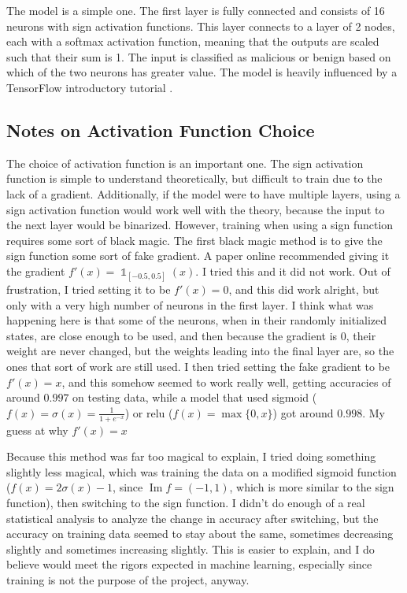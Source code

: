 \documentclass{article}
\DeclareMathOperator{\im}{Im}
\DeclareMathOperator{\1}{\mathbb{1}}
\begin{document}
The model is a simple one. The first layer is fully connected and consists of 16 neurons with sign activation functions. This layer connects to a layer of 2 nodes, each with a softmax activation function, meaning that the outputs are scaled such that their sum is 1. The input is classified as malicious or benign based on which of the two neurons has greater value. The model is heavily influenced by a TensorFlow introductory tutorial \cite{tftut}.

\subsection{Notes on Activation Function Choice}

The choice of activation function is an important one. The sign activation function is simple to understand theoretically, but difficult to train due to the lack of a gradient. Additionally, if the model were to have multiple layers, using a sign activation function would work well with the theory, because the input to the next layer would be binarized. However, training when using a sign function requires some sort of black magic. The first black magic method is to give the sign function some sort of fake gradient. A paper online recommended giving it the gradient $f'(x) = \1_{[-0.5, 0.5]}(x)$. I tried this and it did not work. Out of frustration, I tried setting it to be $f'(x) = 0$, and this did work alright, but only with a very high number of neurons in the first layer. I think what was happening here is that some of the neurons, when in their randomly initialized states, are close enough to be used, and then because the gradient is 0, their weight are never changed, but the weights leading into the final layer are, so the ones that sort of work are still used. I then tried setting the fake gradient to be $f'(x) = x$, and this somehow seemed to work really well, getting accuracies of around $0.997$ on testing data, while a model that used sigmoid ($f(x) = \sigma(x) = \frac{1}{1 + e^{-x}}$) or relu ($f(x) = \max\{0, x\}$) got around $0.998$. My guess at why $f'(x) = x$

Because this method was far too magical to explain, I tried doing something slightly less magical, which was training the data on a modified sigmoid function ($f(x) = 2\sigma(x) - 1$, since $\im f = (-1, 1)$, which is more similar to the sign function), then switching to the sign function. I didn't do enough of a real statistical analysis to analyze the change in accuracy after switching, but the accuracy on training data seemed to stay about the same, sometimes decreasing slightly and sometimes increasing slightly. This is easier to explain, and I do believe would meet the rigors expected in machine learning, especially since training is not the purpose of the project, anyway.
\end{document}
